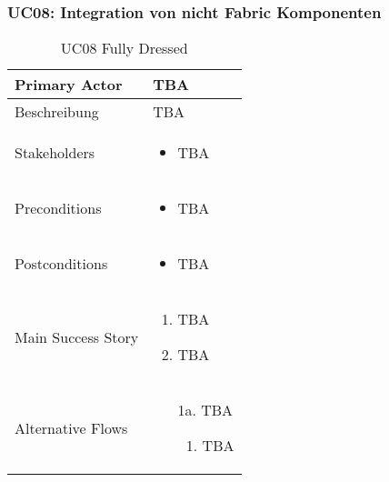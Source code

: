 \subsubsection{UC08: Integration von nicht Fabric Komponenten}
\begin{table}[H]
	\centering
	\begin{tabularx}{\textwidth}{l | X}
		Primary Actor   & TBA       \\
		\hline
		Beschreibung   & TBA  \\ 
		\hline
		Stakeholders       & 
		\begin{itemize}
			\item TBA
		\end{itemize} \\ 
		Preconditions      &
		\begin{itemize}	
			\item TBA
		\end{itemize}  \\
		\hline
		Postconditions     & 
		\begin{itemize}	
			\item TBA
		\end{itemize}  \\
		\hline
		Main Success Story & 
		\begin{enumerate}
			\item TBA
			\item TBA
		\end{enumerate}
		\\
		\hline
		Alternative Flows  & 
		\begin{itemize}
			\item[1a.]  TBA
			\begin{enumerate}
				\item TBA
			\end{enumerate}
		\end{itemize}
	\end{tabularx}
	\caption{UC08 Fully Dressed}
	\label{tab:UC08}
\end{table}

